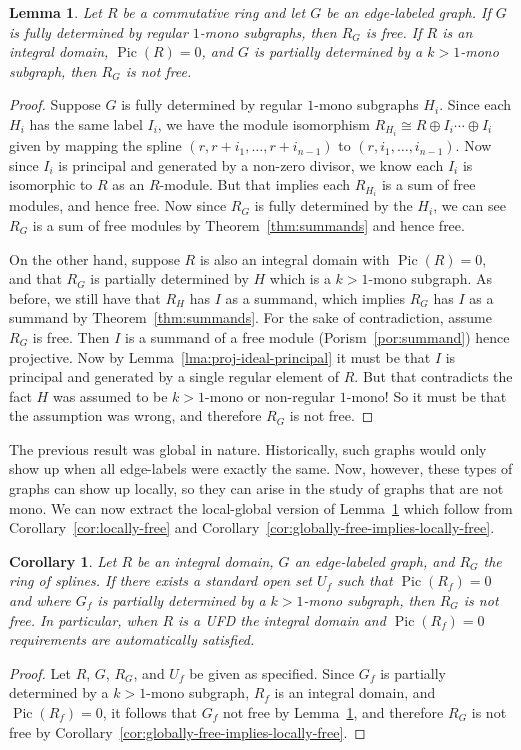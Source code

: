 \documentclass{article}
\DeclareMathOperator{\Pic}{Pic}
\newtheorem{corollary}{Corollary}
\newtheorem{lemma}{Lemma}
\begin{document}
\begin{lemma}
\label{lma:mono}
Let $R$ be a commutative ring and let $G$ be an edge-labeled graph. If $G$ is fully determined by regular $1$-mono subgraphs, then $R_G$ is free. If $R$ is an integral domain, $\Pic(R) = 0$, and $G$ is partially determined by a $k>1$-mono subgraph, then $R_G$ is not free.  
\end{lemma}

\begin{proof}
Suppose $G$ is fully determined by regular $1$-mono subgraphs $H_i$. Since each $H_i$ has the same label $I_i$, we have the module isomorphism $R_{H_i} \cong R \oplus I_i \cdots \oplus I_i$ given by mapping the spline $(r, r+i_1, \dots , r+i_{n-1})$ to $(r, i_1, \dots , i_{n-1})$. Now since $I_i$ is principal and generated by a non-zero divisor, we know each $I_i$ is isomorphic to $R$ as an $R$-module. But that implies each $R_{H_i}$ is a sum of free modules, and hence free. Now since $R_G$ is fully determined by the $H_i$, we can see $R_G$ is a sum of free modules by Theorem~\ref{thm:summands} and hence free.

On the other hand, suppose $R$ is also an integral domain with $\Pic(R)=0$, and that $R_G$ is partially determined by $H$ which is a $k>1$-mono subgraph. As before, we still have that $R_H$ has $I$ as a summand, which implies $R_G$ has $I$ as a summand by Theorem~\ref{thm:summands}. For the sake of contradiction, assume $R_G$ is free. Then $I$ is a summand of a free module (Porism~\ref{por:summand}) hence projective. Now by Lemma~\ref{lma:proj-ideal-principal} it must be that $I$ is principal and generated by a single regular element of $R$. But that contradicts the fact $H$ was assumed to be $k>1$-mono or non-regular $1$-mono! So it must be that the assumption was wrong, and therefore $R_G$ is not free.
\end{proof}

The previous result was global in nature. Historically, such graphs would only show up when all edge-labels were exactly the same. Now, however, these types of graphs can show up locally, so they can arise in the study of graphs that are not mono. We can now extract the local-global version of Lemma~\ref{lma:mono} which follow from Corollary~\ref{cor:locally-free} and Corollary~\ref{cor:globally-free-implies-locally-free}.


\begin{corollary}
\label{cor:mono-not-free-cor}
Let $R$ be an integral domain, $G$ an edge-labeled graph, and $R_G$ the ring of splines. If there exists a standard open set $U_f$ such that $\Pic(R_f)=0$ and where $G_f$ is partially determined by a $k>1$-mono subgraph, then $R_G$ is not free. In particular, when $R$ is a UFD the integral domain and $\Pic(R_f)=0$ requirements are automatically satisfied.
\end{corollary}
\begin{proof}
Let $R$, $G$, $R_G$, and $U_f$ be given as specified. Since $G_f$ is partially determined by a $k>1$-mono subgraph, $R_f$ is an integral domain, and $\Pic(R_f)=0$, it follows that $G_f$ not free by Lemma~\ref{lma:mono}, and therefore $R_G$ is not free by Corollary~\ref{cor:globally-free-implies-locally-free}.
\end{proof}
\end{document}

